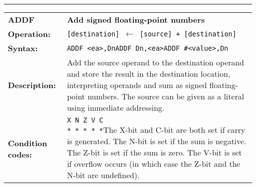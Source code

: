 \documentclass[]{article}
\begin{document}
\begin{appendices}
\noindent\rule{10cm}{1pt}\newline %
\setlength\extrarowheight{5pt} %
\begin{tabularx}{\textwidth}{lL}
  {\Large \textbf{ADDF}} 	& {\Large \textbf{Add signed floating-point numbers}}\\
  \textbf{Operation:} 		& \texttt{[destination] $\leftarrow$ [source] + [destination]}\\
  \textbf{Syntax:}  		& \texttt{ADDF <ea>,Dn}\newline\texttt{ADDF Dn,<ea>}\newline\texttt{ADDF \#<value>,Dn}\\
  \textbf{Description:}  	& Add the source operand to the destination operand and store the
result in the destination location, interpreting operands and sum as signed floating-point numbers. The source can be given as a literal using immediate addressing.\\
  \textbf{Condition codes:} & \texttt{X N Z V C\newline * * * * *}\newline\newline The X-bit and C-bit are both set if carry is generated. The N-bit is set if the sum is negative. The Z-bit is set if the sum is zero. The V-bit is set if overflow occurs (in which case the Z-bit and the N-bit are undefined).\\
\end{tabularx}
\newline

\newpage


\end{appendices}
\end{document}
